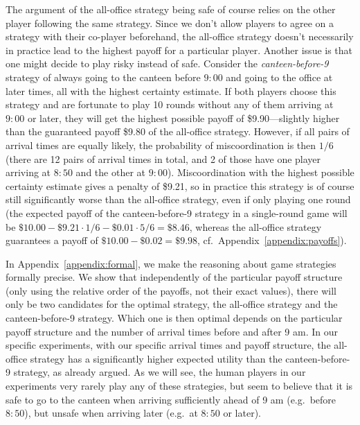 The argument of the all-office strategy being safe of course relies on the other player following the same strategy. Since we don't allow players to agree on a strategy with their co-player beforehand, the all-office strategy doesn't necessarily in practice lead to the highest payoff for a particular player. Another issue is that one might decide to play risky instead of safe. Consider the \emph{canteen-before-9} strategy of always going to the canteen before $9{:}00$ and going to the office at later times, all with the highest certainty estimate. If both players choose this strategy and are fortunate to play 10 rounds without any of them arriving  at $9{:}00$ or later, they will get the highest possible payoff of \$9.90---slightly higher than the guaranteed payoff \$9.80 of the all-office strategy. However, if all pairs of arrival times are equally likely, the probability of miscoordination is then $1/6$ (there are 12 pairs of arrival times in total, and 2 of those have one player arriving at $8{:}50$ and the other at $9{:}00$). Miscoordination with the highest possible certainty estimate gives a penalty of \$9.21, so in practice this strategy is of course still significantly worse than the all-office strategy, even if only playing one round (the expected payoff of the canteen-before-9 strategy in a single-round game will be $\$10.00 - \$9.21\cdot 1/6 - \$0.01\cdot 5/6 = \$8.46$, whereas the all-office strategy guarantees a payoff of $\$10.00-\$0.02 = \$9.98$, cf.\ Appendix~\ref{appendix:payoffs}).

In Appendix~\ref{appendix:formal}, %
we make the reasoning about game strategies formally precise. We show that independently of the particular payoff structure (only using the relative order of the payoffs, not their exact values), there will only be two candidates for the optimal strategy, the all-office strategy and the canteen-before-9 strategy. Which one is then optimal depends on the particular payoff structure and the number of arrival times before and after 9 am. In our specific experiments, with our specific arrival times and payoff structure, the all-office strategy has a significantly higher expected utility than the canteen-before-9 strategy, as already argued. As we will see, the human players in our experiments very rarely play any of these strategies, but seem to believe that it is safe to go to the canteen 
when arriving sufficiently ahead of 9 am (e.g.\ before $8{:}50$), but unsafe when arriving later (e.g.\ at $8{:}50$ or later).


